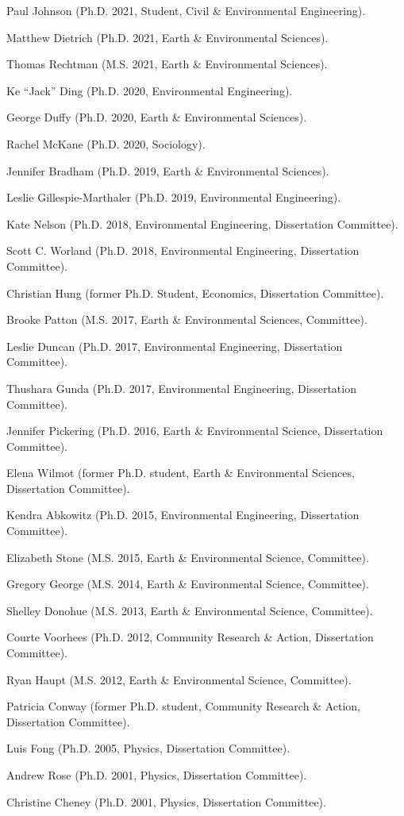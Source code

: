 \item Paul Johnson (Ph.D. 2021, Student, Civil \& Environmental Engineering).
\item Matthew Dietrich (Ph.D. 2021, Earth \& Environmental Sciences).
\item Thomas Rechtman (M.S. 2021, Earth \& Environmental Sciences).
\item Ke ``Jack'' Ding (Ph.D. 2020, Environmental Engineering).
\item George Duffy (Ph.D. 2020, Earth \& Environmental Sciences).
\item Rachel McKane (Ph.D. 2020, Sociology).
\item Jennifer Bradham (Ph.D. 2019, Earth \& Environmental Sciences).
\item Leslie Gillespie-Marthaler (Ph.D. 2019, Environmental Engineering).
\item Kate Nelson (Ph.D. 2018, Environmental Engineering, Dissertation Committee).
\item Scott C. Worland (Ph.D. 2018, Environmental Engineering, Dissertation Committee).
\item Christian Hung (former Ph.D. Student, Economics, Dissertation Committee).
\item Brooke Patton (M.S. 2017, Earth \& Environmental Sciences, Committee).
\item Leslie Duncan (Ph.D. 2017, Environmental Engineering, Dissertation Committee).
\item Thushara Gunda (Ph.D. 2017, Environmental Engineering, Dissertation Committee).
\item Jennifer Pickering (Ph.D. 2016, Earth \& Environmental Science, Dissertation Committee).
\item Elena Wilmot (former Ph.D. student, Earth \& Environmental Sciences, Dissertation Committee).
\item Kendra Abkowitz (Ph.D. 2015, Environmental Engineering, Dissertation Committee).
\item Elizabeth Stone (M.S. 2015, Earth \& Environmental Science, Committee).
\item Gregory George (M.S. 2014, Earth \& Environmental Science, Committee).
\item Shelley Donohue (M.S. 2013, Earth \& Environmental Science, Committee).
\item Courte Voorhees (Ph.D. 2012,  Community Research \& Action, Dissertation Committee).
\item Ryan Haupt (M.S. 2012, Earth \& Environmental Science, Committee).
\item Patricia Conway (former Ph.D. student, Community Research \& Action, Dissertation Committee).
\item Luis Fong (Ph.D. 2005, Physics, Dissertation Committee).
\item Andrew Rose (Ph.D. 2001, Physics, Dissertation Committee).
\item Christine Cheney (Ph.D. 2001, Physics, Dissertation Committee).

